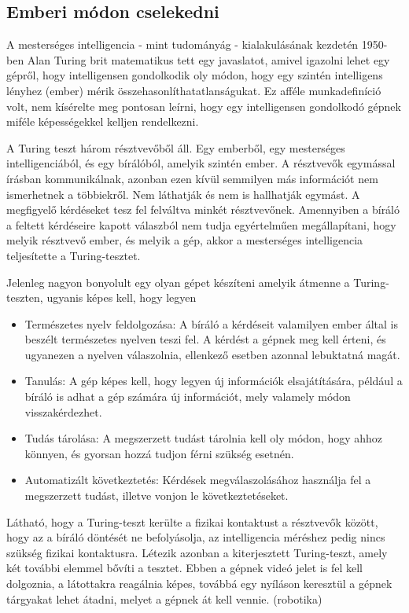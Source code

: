 \subsection{Emberi módon cselekedni}
A mesterséges intelligencia - mint tudományág - kialakulásának kezdetén 1950-ben Alan Turing brit matematikus tett egy javaslatot, amivel igazolni lehet egy gépről, hogy intelligensen gondolkodik oly módon, hogy egy szintén intelligens lényhez (ember) mérik összehasonlíthatatlanságukat. Ez afféle munkadefiníció volt, nem kísérelte meg pontosan leírni, hogy egy intelligensen gondolkodó gépnek miféle képességekkel kelljen rendelkezni.\ujsor

A Turing teszt három résztvevőből áll. Egy emberből, egy mesterséges intelligenciából, és egy bírálóból, amelyik szintén ember. A résztvevők egymással írásban kommunikálnak, azonban ezen kívül semmilyen más információt nem ismerhetnek a többiekről. Nem láthatják és nem is hallhatják egymást. A megfigyelő kérdéseket tesz fel felváltva minkét résztvevőnek. Amennyiben a bíráló a feltett kérdéseire kapott válaszból nem tudja egyértelműen megállapítani, hogy melyik résztvevő ember, és melyik a gép, akkor a mesterséges intelligencia teljesítette a Turing-tesztet.\ujsor

Jelenleg nagyon bonyolult egy olyan gépet készíteni amelyik átmenne a Turing-teszten, ugyanis képes kell, hogy legyen
\begin{itemize}
	\item Természetes nyelv feldolgozása: A bíráló a kérdéseit valamilyen ember által is beszélt természetes nyelven teszi fel. A kérdést a gépnek meg kell érteni, és ugyanezen a nyelven válaszolnia, ellenkező esetben azonnal lebuktatná magát.
	\item Tanulás: A gép képes kell, hogy legyen új információk elsajátítására, például a bíráló is adhat a gép számára új információt, mely valamely módon visszakérdezhet.
	\item Tudás tárolása: A megszerzett tudást tárolnia kell oly módon, hogy ahhoz könnyen, és gyorsan hozzá tudjon férni szükség esetnén.
	\item Automatizált következtetés: Kérdések megválaszolásához használja fel a megszerzett tudást, illetve vonjon le következtetéseket.
\end{itemize}

Látható, hogy a Turing-teszt kerülte a fizikai kontaktust a résztvevők között, hogy az a bíráló döntését ne befolyásolja, az intelligencia méréshez pedig nincs szükség fizikai kontaktusra. Létezik azonban a kiterjesztett Turing-teszt, amely két további elemmel bővíti a tesztet. Ebben a gépnek videó jelet is fel kell dolgoznia, a látottakra reagálnia képes, továbbá egy nyíláson keresztül a gépnek tárgyakat lehet átadni, melyet a gépnek át kell vennie. (robotika)\ujsor

